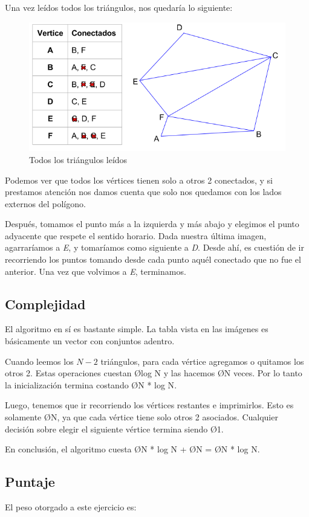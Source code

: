 Una vez leídos todos los triángulos, nos quedaría lo siguiente:

\begin{figure}[H]\centering\includegraphics[scale=0.7]{Imagenes/ej1/Imagen_F.png}\caption{Todos los triángulos leídos}\end{figure}

Podemos ver que todos los vértices tienen solo a otros 2 conectados, y si prestamos atención nos damos cuenta que solo nos quedamos con los lados externos del polígono.

Después, tomamos el punto más a la izquierda y más abajo y elegimos el punto adyacente que respete el sentido horario. Dada nuestra última imagen, agarraríamos a \textit{E}, y tomaríamos como siguiente a \textit{D}. Desde ahí, es cuestión de ir recorriendo los puntos tomando desde cada punto aquél conectado que no fue el anterior. Una vez que volvimos a \textit{E}, terminamos.

\subsection{Complejidad}
El algoritmo en sí es bastante simple. La tabla vista en las imágenes es básicamente un vector con conjuntos adentro.

Cuando leemos los $N - 2$ triángulos, para cada vértice agregamos o quitamos los otros 2. Estas operaciones cuestan \O{log N} y las hacemos \O{N} veces. Por lo tanto la inicialización termina costando \O{N * log N}.

Luego, tenemos que ir recorriendo los vértices restantes e imprimirlos. Esto es solamente \O{N}, ya que cada vértice tiene solo otros 2 asociados. Cualquier decisión sobre elegir el siguiente vértice termina siendo \O{1}.

En conclusión, el algoritmo cuesta \O{N * log N} + \O{N} = \O{N * log N}.

\subsection{Puntaje}
El peso otorgado a este ejercicio es:
